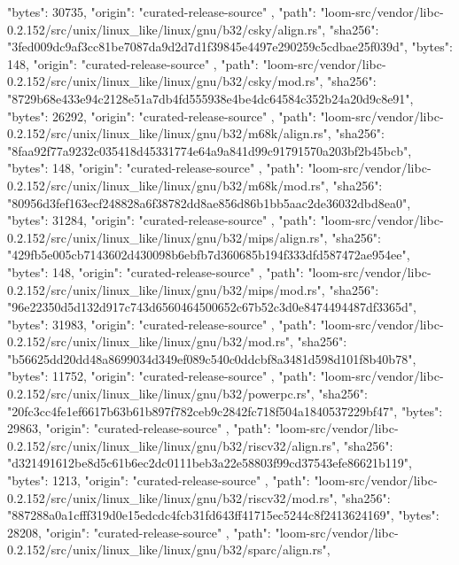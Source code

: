 {{      "bytes": 30735,
      "origin": "curated-release-source"
    },
    {
      "path": "loom-src/vendor/libc-0.2.152/src/unix/linux_like/linux/gnu/b32/csky/align.rs",
      "sha256": "3fed009dc9af3cc81be7087da9d2d7d1f39845e4497e290259c5cdbae25f039d",
      "bytes": 148,
      "origin": "curated-release-source"
    },
    {
      "path": "loom-src/vendor/libc-0.2.152/src/unix/linux_like/linux/gnu/b32/csky/mod.rs",
      "sha256": "8729b68e433e94c2128e51a7db4fd555938e4be4dc64584c352b24a20d9c8e91",
      "bytes": 26292,
      "origin": "curated-release-source"
    },
    {
      "path": "loom-src/vendor/libc-0.2.152/src/unix/linux_like/linux/gnu/b32/m68k/align.rs",
      "sha256": "8faa92f77a9232c035418d45331774e64a9a841d99c91791570a203bf2b45bcb",
      "bytes": 148,
      "origin": "curated-release-source"
    },
    {
      "path": "loom-src/vendor/libc-0.2.152/src/unix/linux_like/linux/gnu/b32/m68k/mod.rs",
      "sha256": "80956d3fef163ecf248828a6f38782dd8ae856d86b1bb5aac2de36032dbd8ea0",
      "bytes": 31284,
      "origin": "curated-release-source"
    },
    {
      "path": "loom-src/vendor/libc-0.2.152/src/unix/linux_like/linux/gnu/b32/mips/align.rs",
      "sha256": "429fb5e005cb7143602d430098b6ebfb7d360685b194f333dfd587472ae954ee",
      "bytes": 148,
      "origin": "curated-release-source"
    },
    {
      "path": "loom-src/vendor/libc-0.2.152/src/unix/linux_like/linux/gnu/b32/mips/mod.rs",
      "sha256": "96e22350d5d132d917c743d6560464500652c67b52c3d0e8474494487df3365d",
      "bytes": 31983,
      "origin": "curated-release-source"
    },
    {
      "path": "loom-src/vendor/libc-0.2.152/src/unix/linux_like/linux/gnu/b32/mod.rs",
      "sha256": "b56625dd20dd48a8699034d349ef089c540c0ddcbf8a3481d598d101f8b40b78",
      "bytes": 11752,
      "origin": "curated-release-source"
    },
    {
      "path": "loom-src/vendor/libc-0.2.152/src/unix/linux_like/linux/gnu/b32/powerpc.rs",
      "sha256": "20fc3cc4fe1ef6617b63b61b897f782ceb9c2842fc718f504a1840537229bf47",
      "bytes": 29863,
      "origin": "curated-release-source"
    },
    {
      "path": "loom-src/vendor/libc-0.2.152/src/unix/linux_like/linux/gnu/b32/riscv32/align.rs",
      "sha256": "d321491612be8d5c61b6ec2dc0111beb3a22e58803f99cd37543efe86621b119",
      "bytes": 1213,
      "origin": "curated-release-source"
    },
    {
      "path": "loom-src/vendor/libc-0.2.152/src/unix/linux_like/linux/gnu/b32/riscv32/mod.rs",
      "sha256": "887288a0a1cfff319d0e15edcdc4fcb31fd643ff41715ec5244c8f2413624169",
      "bytes": 28208,
      "origin": "curated-release-source"
    },
    {
      "path": "loom-src/vendor/libc-0.2.152/src/unix/linux_like/linux/gnu/b32/sparc/align.rs",
}}
